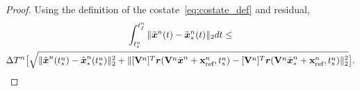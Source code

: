 \begin{proof}
Using the definition of the costate~\eqref{eq:costate_def} and residual, 
\begin{multline*}
\intSlabArg{n} \norm{\stateROMSolArgt{n}{t} - \stateROMStarSolArgt{n}{t}} dt 
\le \\  \DeltaSlabArg{n} \big[ \sqrt{ \norm{\genstateROMSolArgt{n}{\timeStartArg{n}} - \genstateROMStarSolArgt{n}{\timeStartArg{n} }}^2 +   \norm{\basisspaceTArg{n} \resid( \basisspaceArg{n} \stateROMSolArg{n} + \stateInterceptArg{n} , {\timeStartArg{n}} ) - 
 \basisspaceTArg{n} \resid( \basisspaceArg{n} \stateROMStarSolArg{n} + \stateInterceptArg{n}, {\timeStartArg{n}}  )}^2  } \big].

\end{multline*}
\end{proof}
